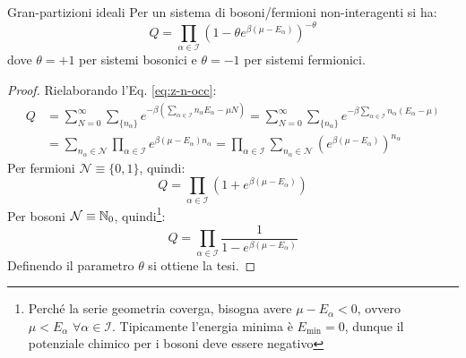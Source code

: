 \begin{theorem}{Gran-partizioni ideali}{}
	Per un sistema di bosoni/fermioni non-interagenti si ha:
	\begin{equation}
		Q = \prod_{\alpha \in \mathcal{I}} \left( 1 - \theta e^{\beta (\mu - E_\alpha)} \right)^{-\theta}
	\end{equation}
	dove $ \theta = +1 $ per sistemi bosonici e $ \theta = -1 $ per sistemi fermionici.

	\tcblower

	\begin{proof}
		Rielaborando l'Eq. \ref{eq:z-n-occ}:
		\begin{equation*}
			\begin{split}
				Q
				& = \sum_{N = 0}^\infty \sum_{\{n_\alpha\}} e^{-\beta ( \sum_{\alpha \in \mathcal{I}} n_\alpha E_\alpha - \mu N)} = \sum_{N = 0}^\infty \sum_{\{n_\alpha\}} e^{-\beta \sum_{\alpha \in \mathcal{I}} n_\alpha (E_\alpha - \mu)} \\
				& = \sum_{n_\alpha \in \mathcal{N}} \prod_{\alpha \in \mathcal{I}} e^{\beta (\mu - E_\alpha) n_\alpha} = \prod_{\alpha \in \mathcal{I}} \sum_{n_\alpha \in \mathcal{N}} \left( e^{\beta (\mu - E_\alpha)} \right)^{n_\alpha}
			\end{split}
		\end{equation*}
		Per fermioni $ \mathcal{N} \equiv \{0,1\} $, quindi:
		\begin{equation*}
			Q = \prod_{\alpha \in \mathcal{I}} \left( 1 + e^{\beta (\mu - E_\alpha)} \right)
		\end{equation*}
		Per bosoni $ \mathcal{N} \equiv \mathbb{N}_0 $, quindi\footnote{Perché la serie geometria coverga, bisogna avere $ \mu - E_\alpha < 0 $, ovvero $ \mu < E_\alpha \,\,\forall \alpha \in \mathcal{I} $. Tipicamente l'energia minima è $ E_\text{min} = 0 $, dunque il potenziale chimico per i bosoni deve essere negativo}:
		\begin{equation*}
			Q = \prod_{\alpha \in \mathcal{I}} \frac{1}{1 - e^{\beta (\mu - E_\alpha)}}
		\end{equation*}
		Definendo il parametro $ \theta $ si ottiene la tesi.
	\end{proof}
\end{theorem}

